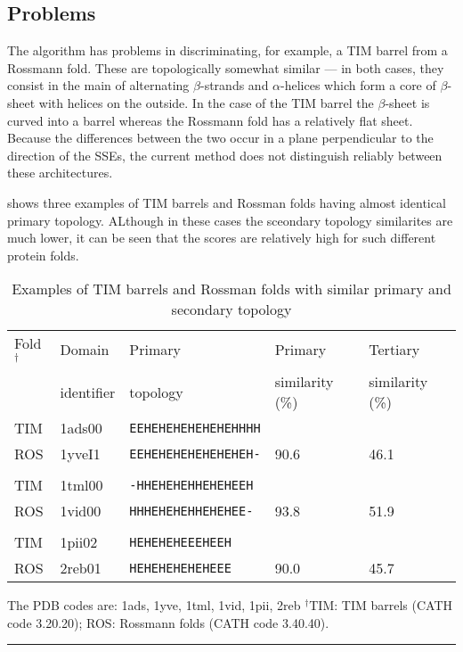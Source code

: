 \documentclass{article}
\begin{document}
\subsection{Problems}
The algorithm has problems in discriminating, for example, a TIM
barrel from a Rossmann fold. These are topologically somewhat similar
--- in both cases, they consist in the main of alternating
$\beta$-strands and $\alpha$-helices which form a core of
$\beta$-sheet with helices on the outside. In the case of the TIM
barrel the $\beta$-sheet is curved into a barrel whereas the Rossmann
fold has a relatively flat sheet. Because the differences between the
two occur in a plane perpendicular to the direction of the SSEs, the
current method does not distinguish reliably between these
architectures.

\tableref{\ref{tab:timros}} shows three examples of TIM barrels and
Rossman folds having almost identical primary topology. ALthough in
these cases the sceondary topology similarites are much lower, it can
be seen that the scores are relatively high for such different protein
folds.



\begin{table}
\caption{\label{tab:timros} Examples of TIM barrels and Rossman folds
with similar primary and secondary topology}
\begin{center}
\begin{tabularx}{\linewidth}{llXll}\hline
Fold$^{\dag}$ %
     & Domain     & Primary                   & Primary         & Tertiary        \\
     & identifier & topology                  & similarity (\%) & similarity (\%) \\ \hline
TIM  & 1ads00     & {\tt EEHEHEHEHEHEHEHHHH}  &                 &                 \\
ROS  & 1yveI1     & {\tt EEHEHEHEHEHEHEHEH-}  & 90.6            & 46.1            \\
     &            &                           &                 &                 \\
TIM  & 1tml00     & {\tt -HHEHEHEHHEHEHEEH}   &                 &                 \\
ROS  & 1vid00     & {\tt HHHEHEHEHHEHEHEE-}   & 93.8            & 51.9            \\
     &            &                           &                 &                 \\
TIM  & 1pii02     & {\tt HEHEHEHEEEHEEH}      &                 &                 \\
ROS  & 2reb01     & {\tt HEHEHEHEHEHEEE}      & 90.0            & 45.7            \\ \hline
\end{tabularx}
\end{center}
The PDB codes are:
1ads\protect\cite{wilson:1ads}, 
1yve\protect\cite{biou:1yve},
1tml\protect\cite{spezio:1tml},
1vid\protect\cite{vidgren:1vid},
1pii\protect\cite{wilmanns:1pii},
2reb\protect\cite{story:2reb}
$^{\dag}$TIM: TIM barrels (CATH code 3.20.20); ROS: Rossmann folds (CATH code 3.40.40).
\hrule
\end{table}
\end{document}
